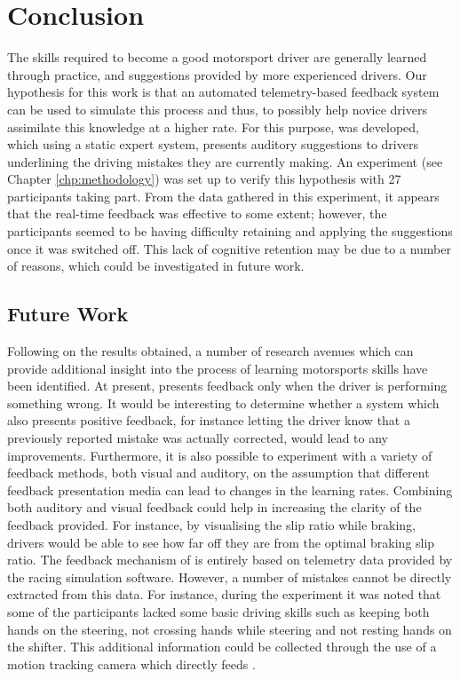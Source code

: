 \chapter{Conclusion}
The skills required to become a good motorsport driver are generally learned through practice, and suggestions provided by more experienced drivers. Our hypothesis for this work is that an automated telemetry-based feedback system can be used to simulate this process and thus, to possibly help novice drivers assimilate this knowledge at a higher rate. For this purpose, \methodname was developed, which using a static expert system, presents auditory suggestions to drivers underlining the driving mistakes they are currently making. An experiment (see Chapter \ref{chp:methodology}) was set up to verify this hypothesis with 27 participants taking part. From the data gathered in this experiment, it appears that the real-time feedback was effective to some extent; however, the participants seemed to be having difficulty retaining and applying the suggestions once it was switched off. This lack of cognitive retention may be due to a number of reasons, which could be investigated in future work.

\section{Future Work}
Following on the results obtained, a number of research avenues which can provide additional insight into the process of learning motorsports skills have been identified. At present, \methodname presents feedback only when the driver is performing something wrong. It would be interesting to determine whether a system which also presents positive feedback, for instance letting the driver know that a previously reported mistake was actually corrected, would lead to any improvements. Furthermore, it is also possible to experiment with a variety of feedback methods, both visual and auditory, on the assumption that different feedback presentation media can lead to changes in the learning rates. Combining both auditory and visual feedback could help in increasing the clarity of the feedback provided. For instance, by visualising the slip ratio while braking, drivers would be able to see how far off they are from the optimal braking slip ratio. The feedback mechanism of \methodname is entirely based on telemetry data provided by the racing simulation software. However, a number of mistakes cannot be directly extracted from this data. For instance, during the experiment it was noted that some of the participants lacked some basic driving skills such as keeping both hands on the steering, not crossing hands while steering and not resting hands on the shifter. This additional information could be collected through the use of a motion tracking camera which directly feeds \methodname.   

